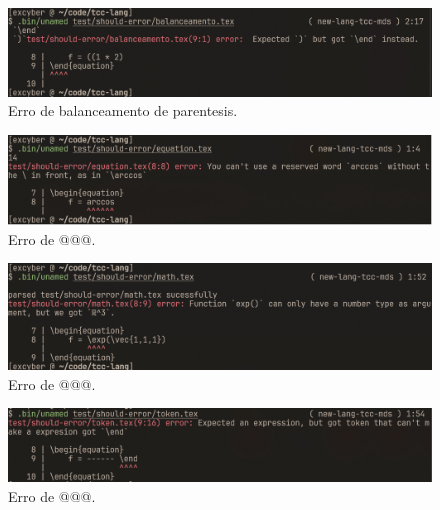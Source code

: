 \begin{figure}[H]
    \caption{\label{error-balanceamento} \small Erro de balanceamento de parentesis.}
    \begin{center}
        \includegraphics[scale=0.5]{./Imagens/error-balanceamento.png}
    \end{center}
\end{figure}

\begin{figure}[H]
    \caption{\label{error-reserved-word} \small Erro de @@@.}
    \begin{center}
        \includegraphics[scale=0.5]{./Imagens/error-reserved-word.png}
    \end{center}
\end{figure}

\begin{figure}[H]
    \caption{\label{error-incompatible-types} \small Erro de @@@.}
    \begin{center}
        \includegraphics[scale=0.5]{./Imagens/error-incompatible-types.png}
    \end{center}
\end{figure}

\begin{figure}[H]
    \caption{\label{error-cant-make-expression} \small Erro de @@@.}
    \begin{center}
        \includegraphics[scale=0.5]{./Imagens/error-cant-make-expression.png}
    \end{center}
\end{figure}

